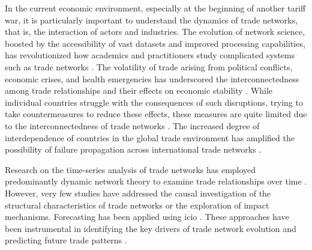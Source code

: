 \documentclass[preprint, 3p,
authoryear]{elsarticle} %
\begin{document}
In the current economic environment, especially at the beginning of
another tariff war, it is particularly important to understand the
dynamics of trade networks, that is, the interaction of actors and
industries. The evolution of network science, boosted by the
accessibility of vast datasets and improved processing capabilities, has
revolutionized how academics and practitioners study complicated systems
such as trade networks \citep{xu2025evolution}. The volatility of trade
arising from political conflicts, economic crises, and health
emergencies has underscored the interconnectedness among trade
relationships and their effects on economic stability \citep{Xiang2013}.
While individual countries struggle with the consequences of such
disruptions, trying to take countermeasures to reduce these effects,
these measures are quite limited due to the interconnectedness of trade
networks \citep{Zhao2024}. The increased degree of interdependence of
countries in the global trade environment has amplified the possibility
of failure propagation across international trade networks
\citep{Kang2024}.

Research on the time-series analysis of trade networks has employed
predominantly dynamic network theory to examine trade relationships over
time \citep{Yazawa2023}. However, very few studies have addressed the
causal investigation of the structural characteristics of trade networks
or the exploration of impact mechanisms. Forecasting has been applied
using \gls{icio} \citep{chen2024prediction}. These approaches have been
instrumental in identifying the key drivers of trade network evolution
and predicting future trade patterns \citep{chen2024prediction}.
\end{document}
